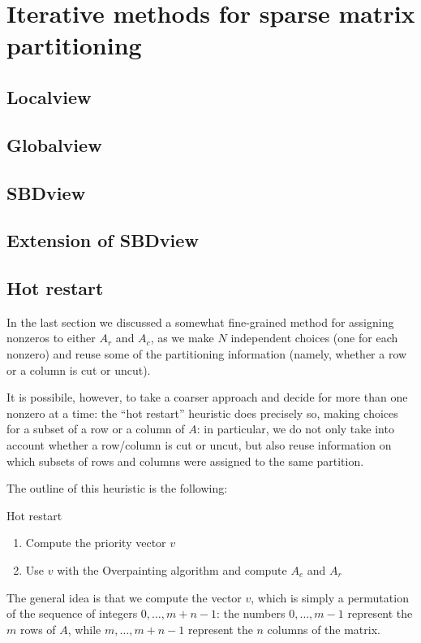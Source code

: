 \chapter{Iterative methods for sparse matrix partitioning}
\section{Localview}
\section{Globalview}
\section{SBDview}
\section{Extension of SBDview}
\section{Hot restart}


In the last section we discussed a somewhat fine-grained method for assigning nonzeros to either $A_r$ and $A_c$, as we make $N$ independent choices (one for each nonzero) and reuse some of the partitioning information (namely, whether a row or a column is cut or uncut).

It is possibile, however, to take a coarser approach and decide for more than one nonzero at a time: the ``hot restart'' heuristic does precisely so, making choices for a subset of a row or a column of $A$: in particular, we do not only take into account whether a row/column is cut or uncut, but also reuse information on which subsets of rows and columns were assigned to the same partition.

The outline of this heuristic is the following:

\begin{algorithm}[H]
 \caption{Hot restart}
 \begin{enumerate}[(1)]
  \item Compute the priority vector $v$
  \item Use $v$ with the Overpainting algorithm and compute $A_c$ and $A_r$
 \end{enumerate}
\end{algorithm}

The general idea is that we compute the vector $v$, which is simply a permutation of the sequence of integers $0,\dots,m+n-1$: the numbers $0,\dots,m-1$ represent the $m$ rows of $A$, while $m,\dots,m+n-1$ represent the $n$ columns of the matrix.

